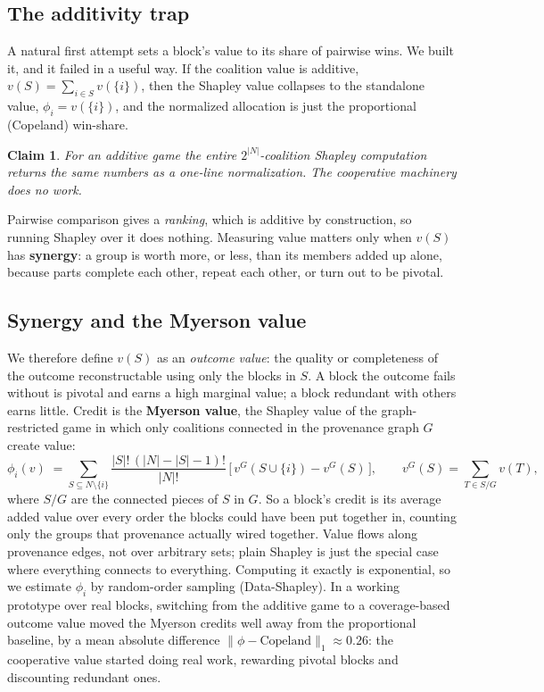 \documentclass[10pt]{article}
\newtheorem{claim}{Claim}
\begin{document}
\subsection{The additivity trap}

A natural first attempt sets a block's value to its share of pairwise wins. We built it, and it failed
in a useful way. If the coalition value is additive, $v(S)=\sum_{i\in S} v(\{i\})$, then the Shapley
value collapses to the standalone value, $\phi_i = v(\{i\})$, and the normalized allocation is just the
proportional (Copeland) win-share.
\begin{claim}
For an additive game the entire $2^{|N|}$-coalition Shapley computation returns the same numbers as a
one-line normalization. The cooperative machinery does no work.
\end{claim}
\noindent
Pairwise comparison gives a \emph{ranking}, which is additive by construction, so running Shapley over
it does nothing. Measuring value matters only when $v(S)$ has \textbf{synergy}: a group is worth more,
or less, than its members added up alone, because parts complete each other, repeat each other, or turn
out to be pivotal.

\subsection{Synergy and the Myerson value}

We therefore define $v(S)$ as an \emph{outcome value}: the quality or completeness of the outcome
reconstructable using only the blocks in $S$. A block the outcome fails without is pivotal and earns a
high marginal value; a block redundant with others earns little. Credit is the \textbf{Myerson value},
the Shapley value of the graph-restricted game in which only coalitions connected in the provenance
graph $G$ create value:
\begin{equation}
\phi_i(v) \;=\!\!\sum_{S \subseteq N\setminus\{i\}}
\frac{|S|!\,(|N|-|S|-1)!}{|N|!}\,\big[\,v^{G}(S\cup\{i\}) - v^{G}(S)\,\big],
\qquad
v^{G}(S) = \!\!\sum_{T \in S/G}\!\! v(T),
\end{equation}
where $S/G$ are the connected pieces of $S$ in $G$. So a block's credit is its average added value over
every order the blocks could have been put together in, counting only the groups that provenance
actually wired together. Value flows along provenance edges, not over arbitrary sets; plain Shapley is
just the special case where everything connects to everything. Computing it exactly is exponential, so
we estimate $\phi_i$ by random-order sampling (Data-Shapley). In a working prototype over real blocks,
switching from the additive game to a coverage-based outcome value moved the Myerson credits well away
from the proportional baseline, by a mean absolute difference $\lVert \phi - \text{Copeland}\rVert_1
\approx 0.26$: the cooperative value started doing real work, rewarding pivotal blocks and discounting
redundant ones.
\end{document}
